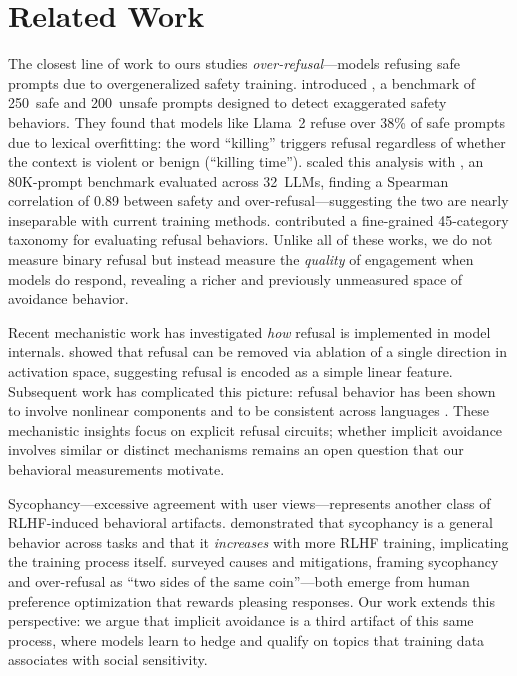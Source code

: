 \section{Related Work}
\label{sec:related}

The closest line of work to ours studies \emph{over-refusal}---models refusing safe prompts due to overgeneralized safety training. \citet{rottger2023xstest} introduced \xstest, a benchmark of 250~safe and 200~unsafe prompts designed to detect exaggerated safety behaviors. They found that models like Llama~2 refuse over 38\% of safe prompts due to lexical overfitting: the word ``killing'' triggers refusal regardless of whether the context is violent or benign (\eg ``killing time''). \citet{cui2024orbench} scaled this analysis with \orbench, an 80K-prompt benchmark evaluated across 32~LLMs, finding a Spearman correlation of 0.89 between safety and over-refusal---suggesting the two are nearly inseparable with current training methods. \citet{xie2024sorrybench} contributed a fine-grained 45-category taxonomy for evaluating refusal behaviors. Unlike all of these works, we do not measure binary refusal but instead measure the \emph{quality} of engagement when models do respond, revealing a richer and previously unmeasured space of avoidance behavior.

Recent mechanistic work has investigated \emph{how} refusal is implemented in model internals. \citet{arditi2024surgical} showed that refusal can be removed via ablation of a single direction in activation space, suggesting refusal is encoded as a simple linear feature. Subsequent work has complicated this picture: refusal behavior has been shown to involve nonlinear components and to be consistent across languages \cite{arditi2024surgical}. These mechanistic insights focus on explicit refusal circuits; whether implicit avoidance involves similar or distinct mechanisms remains an open question that our behavioral measurements motivate.

Sycophancy---excessive agreement with user views---represents another class of RLHF-induced behavioral artifacts. \citet{sharma2023sycophancy} demonstrated that sycophancy is a general behavior across tasks and that it \emph{increases} with more RLHF training, implicating the training process itself. \citet{malmqvist2024sycophancy} surveyed causes and mitigations, framing sycophancy and over-refusal as ``two sides of the same coin''---both emerge from human preference optimization that rewards pleasing responses. Our work extends this perspective: we argue that implicit avoidance is a third artifact of this same process, where models learn to hedge and qualify on topics that training data associates with social sensitivity.

